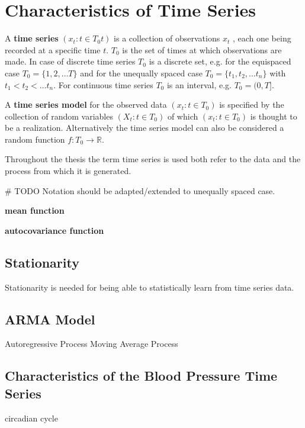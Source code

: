 

\chapter{Characteristics of Time Series}

A \textbf{time series} $(x_t: t \in T_0t)$ is a collection of observations $x_t$ ,
each one being recorded at a specific time $t$. $T_0$ is the set of times at which observations are made.
In case of discrete time series $T_0$ is a discrete set, e.g. for the equispaced case $T_0 = \{1, 2, \dots T\}$ and
for the unequally spaced case $T_0 = \{t_1, t_2, \dots t_n\}$ with $t_1 < t_2 < \dots t_n$.
For continuous time series $T_0$ is an interval, e.g. $T_0 = (0, T]$.

A \textbf{time series model} for the observed data $(x_t: t \in T_0)$ is specified by the collection of random variables
$(X_t: t \in T_0)$ of which $(x_t: t \in T_0)$ is thought to be a realization.
Alternatively the time series model can also be considered a random function $f: T_0 \to \mathbb{R}$.

Throughout the thesis the term time series is used both refer to the data and the process from which it is generated.

\citeauthor{brockwell_introduction_2016}


# TODO Notation should be adapted/extended to unequally spaced case.


\textbf{mean function}

\textbf{autocovariance function}


\section{Stationarity}
Stationarity is needed for being able to statistically learn from time series data.



\section{ARMA Model}

Autoregressive Process
Moving Average Process



\section{Characteristics of the Blood Pressure Time Series}

circadian cycle






